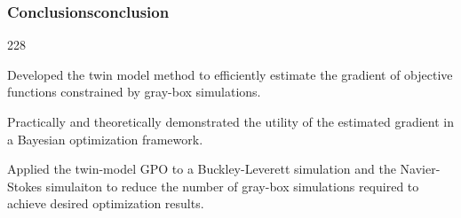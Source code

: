 \documentclass{beamer}
\newcommand{\barrow}{\item[\color{darkred}\ding{228}]}
\begin{document}
\begin{frame}
    \frametitle{Conclusions\hfill \scriptsize{conclusion}} \small
    
    \begin{dinglist}{228}


        \barrow Developed the twin model method to efficiently estimate the gradient of objective functions constrained by gray-box simulations.
                \vspace{.3cm}
        \barrow Practically and theoretically demonstrated the utility of the estimated gradient in a Bayesian optimization framework.
                \vspace{.3cm}
        \barrow Applied the twin-model GPO to a Buckley-Leverett simulation and the Navier-Stokes simulaiton to reduce
                the number of gray-box simulations required to achieve desired optimization results.
    \end{dinglist}
\end{frame}
\end{document}
